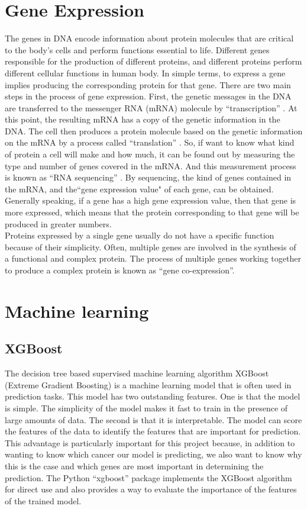 \documentclass[12pt,a4paper]{report}
\begin{document}
\section{Gene Expression}
The genes in DNA encode information about protein molecules that are critical to the body's cells and perform functions essential to life. Different genes responsible for the production of different proteins, and different proteins perform different cellular functions in human body. In simple terms, to express a gene implies producing the corresponding protein for that gene. There are two main steps in the process of gene expression. First, the genetic messages in the DNA are transferred to the messenger RNA (mRNA) molecule by “transcription” \cite{Liu16}. At this point, the resulting mRNA has a copy of the genetic information in the DNA.  The cell then produces a protein molecule based on the genetic information on the mRNA by a process called “translation” \cite{Bio14}. So, if want to know what kind of protein a cell will make and how much, it can be found out by measuring the type and number of genes covered in the mRNA. And this measurement process is known as “RNA sequencing” \cite{RNA-Seq}. By sequencing, the kind of genes contained in the mRNA, and the``gene expression value" of each gene, can be obtained. Generally speaking, if a gene has a high gene expression value, then that gene is more expressed, which means that the protein corresponding to that gene will be produced in greater numbers.\\

Proteins expressed by a single gene usually do not have a specific function because of their simplicity. Often, multiple genes are involved in the synthesis of a functional and complex protein. The process of multiple genes working together to produce a complex protein is known as “gene co-expression”. \\


\section{Machine learning}
\subsection{XGBoost}

The decision tree based supervised machine learning algorithm XGBoost (Extreme Gradient Boosting) \cite{XGB16} is a machine learning model that is often used in prediction tasks. This model has two outstanding features. One is that the model is simple. The simplicity of the model makes it fast to train in the presence of large amounts of data. The second is that it is interpretable. The model can score the features of the data to identify the features that are important for prediction. This advantage is particularly important for this project because, in addition to wanting to know which cancer our model is predicting, we also want to know why this is the case and which genes are most important in determining the prediction. The Python ``xgboost'' package \cite{XGBPy} implements the XGBoost algorithm for direct use and also provides a way to evaluate the importance of the features of the trained model.
\end{document}
